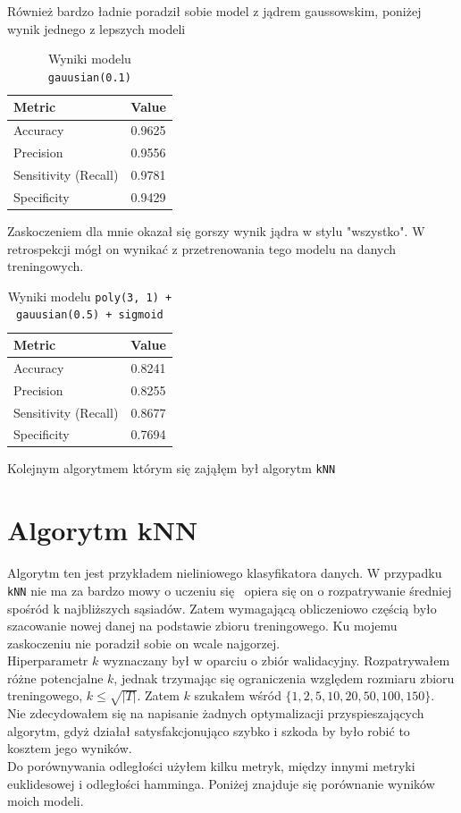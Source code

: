 \documentclass[polish,12pt,a4paper]{extarticle}
\renewcommand\leq{\leqslant}
\begin{document}
Również bardzo ładnie poradził sobie model z jądrem gaussowskim, poniżej wynik jednego z lepszych modeli
\begin{table}[h!]
\centering
\begin{tabular}{|l|c|}
\hline
\textbf{Metric}     & \textbf{Value} \\
\hline
Accuracy   & 0.9625 \\
Precision  & 0.9556 \\
Sensitivity (Recall) & 0.9781 \\
Specificity & 0.9429 \\
\hline
\end{tabular} \FloatBarrier
\caption{Wyniki modelu \texttt{gauusian(0.1)}}
\label{tab:metrics}
\end{table}

Zaskoczeniem dla mnie okazał się gorszy wynik jądra w stylu "wszystko". W retrospekcji mógł on wynikać z przetrenowania tego modelu na danych treningowych.

\begin{table}[h!]
\centering
\begin{tabular}{|l|c|}
\hline
\textbf{Metric}     & \textbf{Value} \\
\hline
Accuracy   & 0.8241 \\
Precision  & 0.8255 \\
Sensitivity (Recall) & 0.8677 \\
Specificity & 0.7694 \\
\hline
\end{tabular}
\caption{Wyniki modelu \texttt{poly(3, 1) + gauusian(0.5) + sigmoid}}
\label{tab:metrics}
\end{table}
Kolejnym algorytmem którym się zająłęm był algorytm \texttt{kNN}
\section*{Algorytm kNN}
Algorytm ten jest przykładem nieliniowego klasyfikatora danych. W przypadku \texttt{kNN} nie ma za bardzo mowy o uczeniu się \textendash\, opiera się on o rozpatrywanie średniej spośród k najbliższych sąsiadów. Zatem wymagającą obliczeniowo częścią było szacowanie nowej danej na podstawie zbioru treningowego. Ku mojemu zaskoczeniu nie poradził sobie on wcale najgorzej. \smallskip \\
Hiperparametr $k$ wyznaczany był w oparciu o zbiór walidacyjny. Rozpatrywałem różne potencjalne $k$, jednak trzymając się ograniczenia względem rozmiaru zbioru treningowego, $k \leq \sqrt{|T|}$. Zatem $k$ szukałem wśród $\{1, 2, 5, 10, 20, 50, 100, 150\}$. \smallskip \\
Nie zdecydowałem się na napisanie żadnych optymalizacji przyspieszających algorytm, gdyż działał satysfakcjonująco szybko i szkoda by było robić to kosztem jego wyników. \smallskip \\
Do porównywania odległości użyłem kilku metryk, między innymi metryki euklidesowej i odległości hamminga. Poniżej znajduje się porównanie wyników moich modeli.
\end{document}

